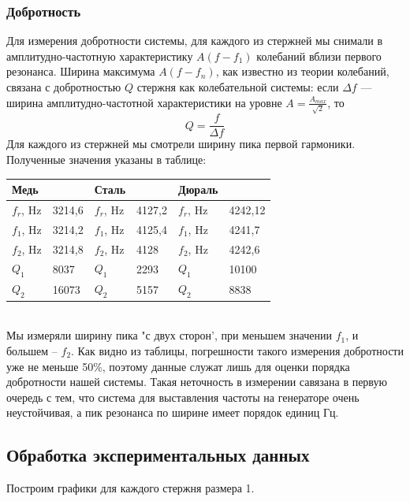 \documentclass[a4paper, 12pt]{article}%
\begin{document}
\subsubsection{Добротность}
Для измерения добротности системы, для каждого из стержней мы снимали в амплитудно-частотную характеристику $A(f-f_1)$ колебаний вблизи первого резонанса. Ширина максимума $A(f-f_n)$, как известно из теории колебаний,
связана с добротностью $Q$ стержня как колебательной системы: если $\Delta f$
— ширина амплитудно-частотной характеристики на уровне $A=\frac{A_{max}}{\sqrt{2}}$, то
\begin{equation}
Q=\frac{f}{\Delta f} 
\end{equation} 
Для каждого из стержней мы смотрели ширину пика первой гармоники. Полученные значения указаны в таблице:
\begin{table}[h]
\begin{tabular}{|ll|ll|ll|}
\hline
Медь                            &        & Сталь                          &        & Дюраль                         &         \\ \hline
\multicolumn{1}{|l|}{$f_r$, Hz} & 3214,6 & \multicolumn{1}{l|}{$f_r$, Hz} & 4127,2 & \multicolumn{1}{l|}{$f_r$, Hz} & 4242,12 \\ \hline
\multicolumn{1}{|l|}{$f_1$, Hz} & 3214,2 & \multicolumn{1}{l|}{$f_1$, Hz} & 4125,4 & \multicolumn{1}{l|}{$f_1$, Hz} & 4241,7  \\ \hline
\multicolumn{1}{|l|}{$f_2$, Hz} & 3214,8 & \multicolumn{1}{l|}{$f_2$, Hz} & 4128   & \multicolumn{1}{l|}{$f_2$, Hz} & 4242,6  \\ \hline
\multicolumn{1}{|l|}{$Q_1$}     & 8037   & \multicolumn{1}{l|}{$Q_1$}     & 2293   & \multicolumn{1}{l|}{$Q_1$}     & 10100   \\ \hline
\multicolumn{1}{|l|}{$Q_2$}     & 16073  & \multicolumn{1}{l|}{$Q_2$}     & 5157   & \multicolumn{1}{l|}{$Q_2$}     & 8838    \\ \hline
\end{tabular}
\end{table}
\\
Мы измеряли ширину пика "с двух сторон', при меньшем значении $f_1$, и большем -- $f_2$. Как видно из таблицы, погрешности такого измерения добротности уже не меньше 50\%, поэтому данные служат лишь для оценки порядка добротности нашей системы. Такая неточность в измерении савязана в первую очередь с тем, что система для выставления частоты на генераторе очень неустойчивая, а пик резонанса по ширине имеет порядок единиц Гц.
\subsection{Обработка экспериментальных данных}
Построим графики для каждого стержня размера 1.
\end{document}
